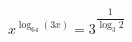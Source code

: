 \begin{ex}[type=equation]
	\begin{condition}
		$x^{\log_{64} (3x)} = 3$\tiny$^{\dfrac{1}{\log_3 2}}$\normalsize
	\end{condition}
\end{ex}